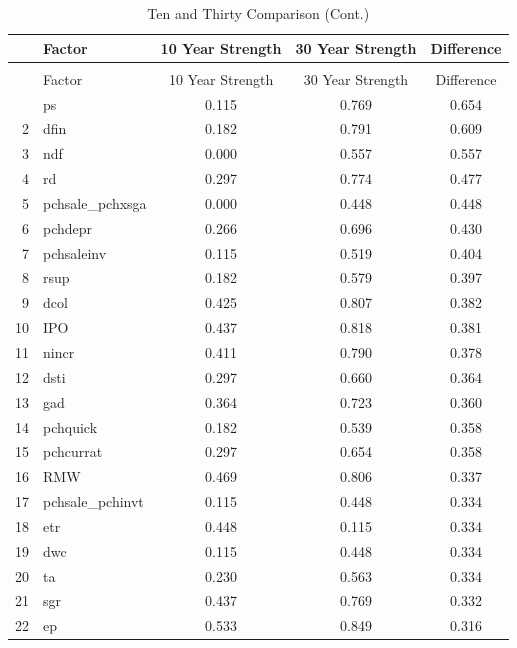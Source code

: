 \documentclass[12pt]{article}
\begin{document}
\newpage

\begin{footnotesize}
	\setlength{\tabcolsep}{2pt}
	\singlespacing
	\centering					
	\begin{longtable}{rl|c|c|c}
		\caption{Ten and Thirty Comparison}\\
		
		\hline
		\hline
		& Factor & 10 Year Strength & 30 Year Strength & Difference \\ 
		\hline
		\endfirsthead
		
		\caption{Ten and Thirty Comparison (Cont.)}\\
		\hline
		\hline
		& Factor & 10 Year Strength & 30 Year Strength & Difference \\
		\hline
		\endhead
		
		\hline\hline
		\endfoot
		1 & ps & 0.115 & 0.769 & 0.654 \\ 
		2 & dfin & 0.182 & 0.791 & 0.609 \\ 
		3 & ndf & 0.000 & 0.557 & 0.557 \\ 
		4 & rd & 0.297 & 0.774 & 0.477 \\ 
		5 & pchsale\_pchxsga & 0.000 & 0.448 & 0.448 \\ 
		6 & pchdepr & 0.266 & 0.696 & 0.430 \\ 
		7 & pchsaleinv & 0.115 & 0.519 & 0.404 \\ 
		8 & rsup & 0.182 & 0.579 & 0.397 \\ 
		9 & dcol & 0.425 & 0.807 & 0.382 \\ 
		10 & IPO & 0.437 & 0.818 & 0.381 \\ 
		11 & nincr & 0.411 & 0.790 & 0.378 \\ 
		12 & dsti & 0.297 & 0.660 & 0.364 \\ 
		13 & gad & 0.364 & 0.723 & 0.360 \\ 
		14 & pchquick & 0.182 & 0.539 & 0.358 \\ 
		15 & pchcurrat & 0.297 & 0.654 & 0.358 \\ 
		16 & RMW & 0.469 & 0.806 & 0.337 \\ 
		17 & pchsale\_pchinvt & 0.115 & 0.448 & 0.334 \\ 
		18 & etr & 0.448 & 0.115 & 0.334 \\ 
		19 & dwc & 0.115 & 0.448 & 0.334 \\ 
		20 & ta & 0.230 & 0.563 & 0.334 \\ 
		21 & sgr & 0.437 & 0.769 & 0.332 \\ 
		22 & ep & 0.533 & 0.849 & 0.316 \\ 

\end{longtable}
\end{footnotesize}
\end{document}
